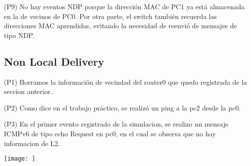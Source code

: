 \documentclass[12pt]{article}
\begin{document}
(P9)  No hay eventos NDP porque la dirección MAC de PC1 ya está almacenada en la de vecinos de PC0. Por otra parte, el switch también recuerda las direcciones MAC aprendidas, evitando la necesidad de reenvió de mensajes de tipo NDP.

\subsection{Non Local Delivery}
 
 (P1) Borramos la información de vecindad del router0 que quedo registrada de la seccion anterior.
 
 (P2) Como dice en el trabajo práctico, se realizó un ping a la pc2 desde la pc0.
 
 (P3) En el primer evento registrado de la simulacion, se realizo un mensaje ICMPv6 de tipo echo Request en pc0, en el cual se observa que no hay informacion de L2.
 
 \texttt{[image: ]}
 
 
\end{document}
